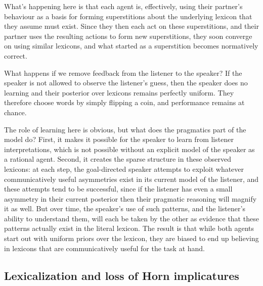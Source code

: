 \documentclass{article} %
\begin{document}
What's happening here is that each agent is, effectively, using their partner's behaviour as a basis for forming superstitions about the underlying lexicon that they assume must exist. Since they then each act on these superstitions, and their partner uses the resulting actions to form new superstitions, they soon converge on using similar lexicons, and what started as a superstition becomes normatively correct.

What happens if we remove feedback from the listener to the speaker? If the speaker is not allowed to observe the listener's guess, then the speaker does no learning and their posterior over lexicons remains perfectly uniform. They therefore choose words by simply flipping a coin, and performance remains at chance.

The role of learning here is obvious, but what does the pragmatics part of the model do? First, it makes it possible for the speaker to learn from listener interpretations, which is not possible without an explicit model of the speaker as a rational agent. Second, it creates the sparse structure in these observed lexicons: at each step, the goal-directed speaker attempts to exploit whatever communicatively useful asymmetries exist in its current model of the listener, and these attempts tend to be successful, since if the listener has even a small asymmetry in their current posterior then their pragmatic reasoning will magnify it as well. But over time, the speaker's use of such patterns, and the listener's ability to understand them, will each be taken by the other as evidence that these patterns actually exist in the literal lexicon. The result is that while both agents start out with uniform priors over the lexicon, they are biased to end up believing in lexicons that are communicatively useful for the task at hand.


\subsection{Lexicalization and loss of Horn implicatures}
\label{sec:horn-emergence}
\end{document}
